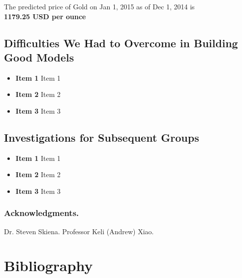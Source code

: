 \documentclass[runningheads]{llncs}
\begin{document}
\noindent The predicted price of Gold on Jan 1, 2015 as of Dec 1, 2014 is \\
\textbf{1179.25 USD per ounce} \\

\subsection {Difficulties We Had to Overcome in Building Good Models}

\begin{itemize}
\item \textbf{Item 1} Item 1
\item \textbf{Item 2} Item 2
\item \textbf{Item 3} Item 3
\end{itemize}

\subsection {Investigations for Subsequent Groups}

\begin{itemize}
\item \textbf{Item 1} Item 1
\item \textbf{Item 2} Item 2
\item \textbf{Item 3} Item 3
\end{itemize}


\subsubsection*{Acknowledgments.} Dr. Steven Skiena. Professor Keli (Andrew) Xiao.

\section{Bibliography}\label{references}
\end{document}
